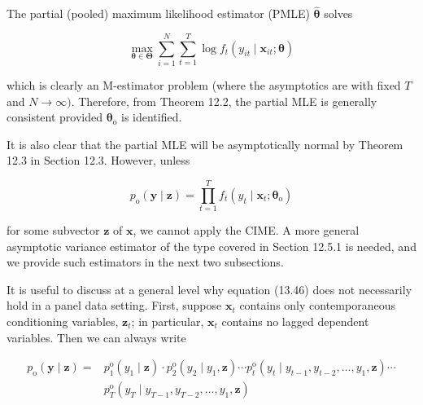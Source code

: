 \documentclass[10pt]{article}
\begin{document}
The partial (pooled) maximum likelihood estimator (PMLE) $\hat{\boldsymbol{\theta}}$ solves


\begin{equation*}
\max _{\boldsymbol{\theta} \in \boldsymbol{\Theta}} \sum_{i=1}^{N} \sum_{t=1}^{T} \log f_{t}\left(y_{i t} \mid \mathbf{x}_{i t} ; \boldsymbol{\theta}\right) \tag{13.45}
\end{equation*}


which is clearly an M-estimator problem (where the asymptotics are with fixed $T$ and $N \rightarrow \infty)$. Therefore, from Theorem 12.2, the partial MLE is generally consistent provided $\boldsymbol{\theta}_{\mathrm{o}}$ is identified.

It is also clear that the partial MLE will be asymptotically normal by Theorem 12.3 in Section 12.3. However, unless


\begin{equation*}
p_{\mathrm{o}}(\mathbf{y} \mid \mathbf{z})=\prod_{t=1}^{T} f_{t}\left(y_{t} \mid \mathbf{x}_{t} ; \boldsymbol{\theta}_{\mathrm{o}}\right) \tag{13.46}
\end{equation*}


for some subvector $\mathbf{z}$ of $\mathbf{x}$, we cannot apply the CIME. A more general asymptotic variance estimator of the type covered in Section 12.5.1 is needed, and we provide such estimators in the next two subsections.

It is useful to discuss at a general level why equation (13.46) does not necessarily hold in a panel data setting. First, suppose $\mathbf{x}_{t}$ contains only contemporaneous conditioning variables, $\mathbf{z}_{t}$; in particular, $\mathbf{x}_{t}$ contains no lagged dependent variables. Then we can always write

$$
\begin{aligned}
p_{\mathrm{o}}(\mathbf{y} \mid \mathbf{z})= & p_{1}^{\mathrm{o}}\left(y_{1} \mid \mathbf{z}\right) \cdot p_{2}^{\mathrm{o}}\left(y_{2} \mid y_{1}, \mathbf{z}\right) \cdots p_{t}^{\mathrm{o}}\left(y_{t} \mid y_{t-1}, y_{t-2}, \ldots, y_{1}, \mathbf{z}\right) \cdots \\
& p_{T}^{\mathrm{o}}\left(y_{T} \mid y_{T-1}, y_{T-2}, \ldots, y_{1}, \mathbf{z}\right)
\end{aligned}
$$
\end{document}
